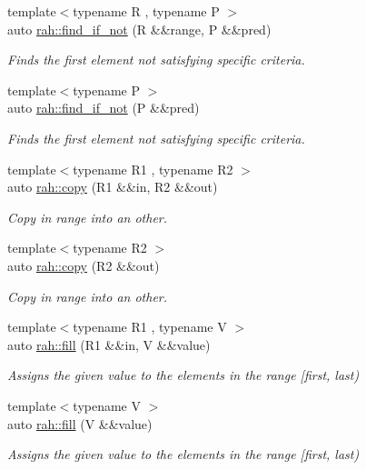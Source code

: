 \begin{DoxyCompactItemize}
{\footnotesize template$<$typename R , typename P $>$ }\\auto \mbox{\hyperlink{namespacerah_af758ef3c67d20ba6260319cb0e0171c5}{rah\+::find\+\_\+if\+\_\+not}} (R \&\&range, P \&\&pred)
\begin{DoxyCompactList}\small\item\em Finds the first element not satisfying specific criteria. \end{DoxyCompactList}\item 
{\footnotesize template$<$typename P $>$ }\\auto \mbox{\hyperlink{namespacerah_a406c37a2cf758e7329bfd696a6bf8f89}{rah\+::find\+\_\+if\+\_\+not}} (P \&\&pred)
\begin{DoxyCompactList}\small\item\em Finds the first element not satisfying specific criteria. \end{DoxyCompactList}\item 
{\footnotesize template$<$typename R1 , typename R2 $>$ }\\auto \mbox{\hyperlink{namespacerah_a1d0f36ff683cedc9090956ea389b3312}{rah\+::copy}} (R1 \&\&in, R2 \&\&out)
\begin{DoxyCompactList}\small\item\em Copy in range into an other. \end{DoxyCompactList}\item 
{\footnotesize template$<$typename R2 $>$ }\\auto \mbox{\hyperlink{namespacerah_ab3873d79b7f878223f24062ba562eba9}{rah\+::copy}} (R2 \&\&out)
\begin{DoxyCompactList}\small\item\em Copy in range into an other. \end{DoxyCompactList}\item 
{\footnotesize template$<$typename R1 , typename V $>$ }\\auto \mbox{\hyperlink{namespacerah_ad6edf0b665289e26018fa3457e25cd6c}{rah\+::fill}} (R1 \&\&in, V \&\&value)
\begin{DoxyCompactList}\small\item\em Assigns the given value to the elements in the range \mbox{[}first, last) \end{DoxyCompactList}\item 
{\footnotesize template$<$typename V $>$ }\\auto \mbox{\hyperlink{namespacerah_a4dc470cd5701a27ad3388c1b1d07d705}{rah\+::fill}} (V \&\&value)
\begin{DoxyCompactList}\small\item\em Assigns the given value to the elements in the range \mbox{[}first, last) \end{DoxyCompactList}\item 

\end{DoxyCompactItemize}
